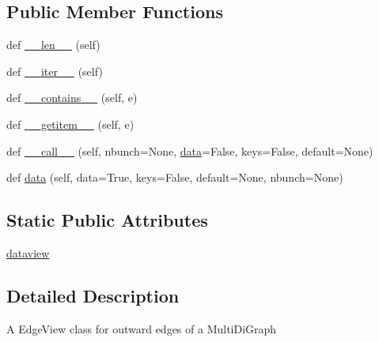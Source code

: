 \subsection*{Public Member Functions}
\begin{DoxyCompactItemize}
\item 
def \hyperlink{classnetworkx_1_1classes_1_1reportviews_1_1OutMultiEdgeView_a43a018e57a013818314e08d83937ace9}{\+\_\+\+\_\+len\+\_\+\+\_\+} (self)
\item 
def \hyperlink{classnetworkx_1_1classes_1_1reportviews_1_1OutMultiEdgeView_a795547038f964f3215336daee9d7afaa}{\+\_\+\+\_\+iter\+\_\+\+\_\+} (self)
\item 
def \hyperlink{classnetworkx_1_1classes_1_1reportviews_1_1OutMultiEdgeView_a35a74ae78034ebd0b27e75351cf53bf4}{\+\_\+\+\_\+contains\+\_\+\+\_\+} (self, e)
\item 
def \hyperlink{classnetworkx_1_1classes_1_1reportviews_1_1OutMultiEdgeView_a42bfc58a5f38f37b71128098afd5a9b5}{\+\_\+\+\_\+getitem\+\_\+\+\_\+} (self, e)
\item 
def \hyperlink{classnetworkx_1_1classes_1_1reportviews_1_1OutMultiEdgeView_af05593f7bf9016a2f3dd7ee6484f9f1e}{\+\_\+\+\_\+call\+\_\+\+\_\+} (self, nbunch=None, \hyperlink{classnetworkx_1_1classes_1_1reportviews_1_1OutMultiEdgeView_a667fd67ceffb2845d521b1a6687dedae}{data}=False, keys=False, default=None)
\item 
def \hyperlink{classnetworkx_1_1classes_1_1reportviews_1_1OutMultiEdgeView_a667fd67ceffb2845d521b1a6687dedae}{data} (self, data=True, keys=False, default=None, nbunch=None)
\end{DoxyCompactItemize}
\subsection*{Static Public Attributes}
\begin{DoxyCompactItemize}
\item 
\hyperlink{classnetworkx_1_1classes_1_1reportviews_1_1OutMultiEdgeView_a403b11bbae6ac7325f6cf8c3f71aa6c9}{dataview}
\end{DoxyCompactItemize}


\subsection{Detailed Description}
\begin{DoxyVerb}A EdgeView class for outward edges of a MultiDiGraph\end{DoxyVerb}
 

